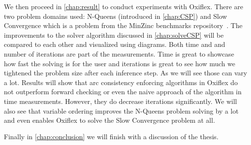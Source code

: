 We then proceed in \cref{chap:result} to conduct experiments with Oxiflex. There are two problem domains used: N-Queens (introduced in \cref{chap:CSP}) and Slow Convergence which is a problem from the MinZinc benchmarks repository~\cite{minizinc_slow:2018}. The improvements to the solver algorithm discussed in \cref{chap:solveCSP} will be compared to each other and visualized using diagrams. Both time and and number of iterations are part of the measurements. Time is great to showcase how fast the solving is for the user and iterations is great to see how much we tightened the problem size after each inference step. As we will see those can vary a lot. Results will show that arc consistency enforcing algorithms in Oxiflex do not outperform forward checking or even the naive approach of the algorithm in time measurements. However, they do decrease iterations significantly. We will also see that variable ordering improves the N-Queens problem solving by a lot and even enables Oxiflex to solve the Slow Convergence problem at all.

Finally in \cref{chap:conclusion} we will finish with a discussion of the thesis.

